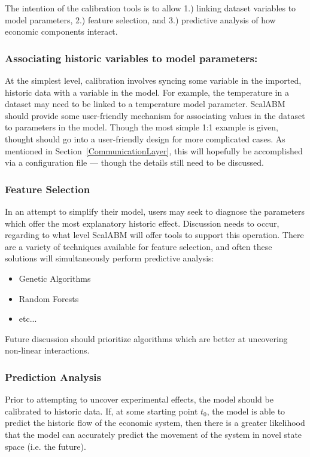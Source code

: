 \documentclass[a4paper]{article}
\begin{document}
The intention of the calibration tools is to allow 1.) linking dataset variables to model parameters, 2.) feature selection, and 3.) predictive analysis of how economic components interact.

\subsubsection{Associating historic variables to model parameters:}

At the simplest level, calibration involves syncing some variable in the imported, historic data with a variable in the model. For example, the temperature in a dataset may need to be linked to a temperature model parameter. ScalABM should provide some user-friendly mechanism for associating values in the dataset to parameters in the model. Though the most simple 1:1 example is given, thought should go into a user-friendly design for more complicated cases. As mentioned in Section~\ref{CommunicationLayer}, this will hopefully be accomplished via a configuration file --- though the details still need to be discussed.

\subsubsection{Feature Selection}

In an attempt to simplify their model, users may seek to diagnose the parameters which offer the most explanatory historic effect. Discussion needs to occur, regarding to what level ScalABM will offer tools to support this operation.
There are a variety of techniques available for feature selection, and often these solutions will simultaneously perform predictive analysis:

\begin{itemize}
    \item Genetic Algorithms
    \item Random Forests
    \item etc... 
\end{itemize}

Future discussion should prioritize algorithms which are better at uncovering non-linear interactions.

\subsubsection{Prediction Analysis}

Prior to attempting to uncover experimental effects, the model should be calibrated to historic data. If, at some starting point $t_0$, the model is able to predict the historic flow of the economic system, then there is a greater likelihood that the model can accurately predict the movement of the system in novel state space (i.e. the future). 
\end{document}
